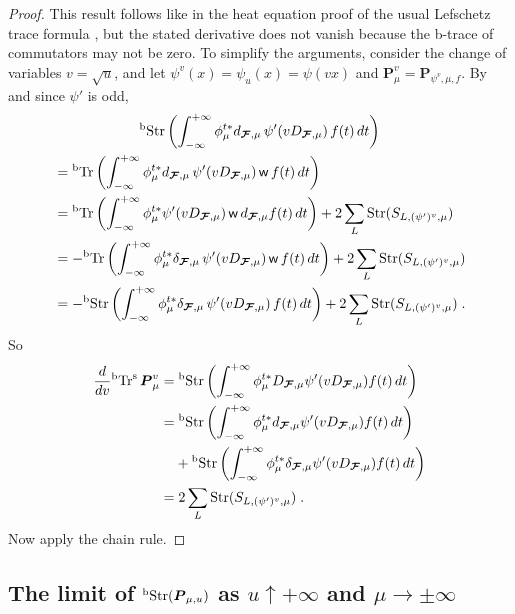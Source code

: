 \documentclass{memo-l}
\theoremstyle{plain}
\theoremstyle{definition}
\theoremstyle{remark}
\newcommand{\FF}{\mathcal{F}}
\newcommand{\bfP}{\boldsymbol{P}}
\newcommand{\bfFF}{\boldsymbol{\FF}}
\newcommand{\sw}{\mathsf{w}}
\newcommand{\Tr}{\operatorname{Tr}}
\newcommand{\bTr}{{}^{\text{\rm b}}\!\Tr}
\newcommand{\Str}{\operatorname{Str}}
\newcommand{\bStr}{{}^{\text{\rm b}}\!\Str}
\numberwithin{section}{chapter}
\numberwithin{equation}{section}%
\begin{document}
\begin{proof}
This result follows like in the heat equation proof of the usual Lefschetz trace formula
\cite{AtiyahBott1967,Gilkey1995,Roe1998}, but the stated derivative does not vanish because the b-trace of commutators may not be zero. To simplify the arguments, consider the change of variables $v=\sqrt u$, and let $\psi^v(x)=\psi_u(x)=\psi(vx)$ and $\bfP^v_\mu=\bfP_{\psi^v,\mu,f}$. By  and since $\psi'$ is odd,
\begin{multline*}
\bStr\left(\int_{-\infty}^{+\infty}\phi^{t*}_\mu d_{\bfFF,\mu}\,\psi'(vD_{\bfFF,\mu})\,f(t)\,dt\right)\\
\begin{aligned}
&=\bTr\left(\int_{-\infty}^{+\infty}\phi^{t*}_\mu d_{\bfFF,\mu}\,\psi'(vD_{\bfFF,\mu})\,\sw\,f(t)\,dt\right)\\
&=\bTr\left(\int_{-\infty}^{+\infty}\phi^{t*}_\mu \psi'(vD_{\bfFF,\mu})\,\sw\,d_{\bfFF,\mu}f(t)\,dt\right)+2\sum_L\Str(S_{L,(\psi')^v,\mu})\\
&=-\bTr\left(\int_{-\infty}^{+\infty}\phi^{t*}_\mu \delta_{\bfFF,\mu}\,\psi'(vD_{\bfFF,\mu})\,\sw\,f(t)\,dt\right)+2\sum_L\Str(S_{L,(\psi')^v,\mu})\\
&=-\bStr\left(\int_{-\infty}^{+\infty}\phi^{t*}_\mu \delta_{\bfFF,\mu}\,\psi'(vD_{\bfFF,\mu})\,f(t)\,dt\right)+2\sum_L\Str(S_{L,(\psi')^v,\mu})\;.
\end{aligned}
\end{multline*}
So
\begin{align*}
\frac{d}{dv}\bTr^{\text{\rm s}} \bfP^v_\mu
&=\bStr\left(\int_{-\infty}^{+\infty}\phi^{t*}_\mu D_{\bfFF,\mu}\psi'(vD_{\bfFF,\mu})f(t)\,dt\right)\\
&=\bStr\left(\int_{-\infty}^{+\infty}\phi^{t*}_\mu d_{\bfFF,\mu}\psi'(vD_{\bfFF,\mu})f(t)\,dt\right)\\
&\phantom{=\text{}}\text{}+\bStr\left(\int_{-\infty}^{+\infty}\phi^{t*}_\mu\delta_{\bfFF,\mu}\psi'(vD_{\bfFF,\mu})f(t)\,dt\right)\\
&=2\sum_L\Str(S_{L,(\psi')^v,\mu})\;.
\end{align*}
Now apply the chain rule.
\end{proof}


\subsection{The limit of $\bStr(\bfP_{\mu,u})$ as $u\uparrow+\infty$ and $\mu\to\pm\infty$}
\label{ss: lim_mu to infty lim_u to infty bTrs(P_u mu)}
\end{document}
